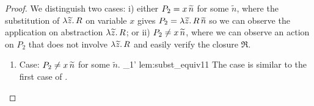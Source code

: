 \begin{proof}
	\noi We distinguish two cases:
	i) either $P_2 = x\, {\widetilde{n}}$ for some $\widetilde{n}$,
	where the substitution of $\lambda \widetilde{z}.\,R$
	on variable $x$ gives
	$P_2 = \lambda \widetilde{z}.\,R\, {\widetilde{n}}$ so we can observe the
	application on abstraction $\lambda \widetilde{z}.\,R$; or
	ii) $P_2 \not= x\, {\widetilde{n}}$, where we can observe
	an action on $P_2$ that does not involve $\lambda \widetilde{z}.\,R$
	and easily verify the closure $\Re$.

	\begin{enumerate} 
	\item Case: $P_2 \not= x\, {\widetilde{n}}$ for some $\widetilde{n}$.
%
		{}
		{\Delta_1'}{}
		{lem:subst_equiv11}
%
	\noi The case is similar to the first case of .


\end{enumerate}
\end{proof}
